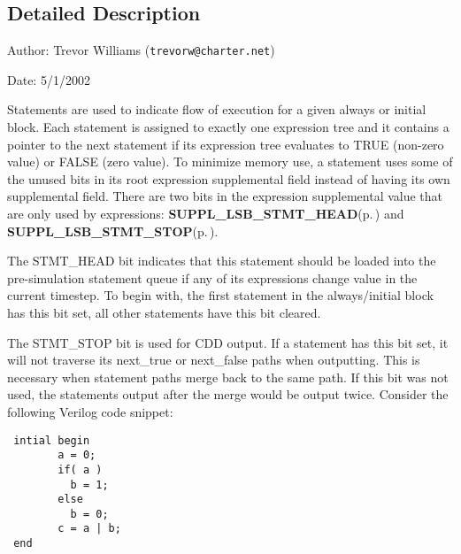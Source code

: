 \subsection{Detailed Description}
\begin{Desc}
\item[Author:]Trevor Williams ({\tt trevorw@charter.net}) \end{Desc}
\begin{Desc}
\item[Date:]5/1/2002\end{Desc}
\begin{Desc}
\item[]Statements are used to indicate flow of execution for a given always or initial block. Each statement is assigned to exactly one expression tree and it contains a pointer to the next statement if its expression tree evaluates to TRUE (non-zero value) or FALSE (zero value). To minimize memory use, a statement uses some of the unused bits in its root expression supplemental field instead of having its own supplemental field. There are two bits in the expression supplemental value that are only used by expressions: {\bf SUPPL\_\-LSB\_\-STMT\_\-HEAD}{\rm (p.\,\pageref{group__expr__suppl_a4})} and {\bf SUPPL\_\-LSB\_\-STMT\_\-STOP}{\rm (p.\,\pageref{group__expr__suppl_a5})}.\end{Desc}
\begin{Desc}
\item[]The STMT\_\-HEAD bit indicates that this statement should be loaded into the pre-simulation statement queue if any of its expressions change value in the current timestep. To begin with, the first statement in the always/initial block has this bit set, all other statements have this bit cleared.\end{Desc}
\begin{Desc}
\item[]The STMT\_\-STOP bit is used for CDD output. If a statement has this bit set, it will not traverse its next\_\-true or next\_\-false paths when outputting. This is necessary when statement paths merge back to the same path. If this bit was not used, the statements output after the merge would be output twice. Consider the following Verilog code snippet:\end{Desc}


\footnotesize\begin{verbatim} intial begin
        a = 0;
        if( a )
          b = 1;
        else
          b = 0;
        c = a | b;
 end
\end{verbatim}\normalsize


